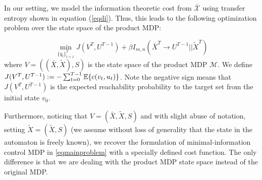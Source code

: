 




In our setting, we model the information theoretic cost from $\mathcal{\bar{X}}$ using transfer entropy shown in equation (\ref{eqdi}). Thus, this leads to the following optimization problem over the state space of the product MDP:

\begin{equation}\label{eqn:nonconstopt}
\min_{\{q_t\}_{t=1}^T} J(V^{T},U^{T-1}) + \beta I_{m,n}(\bar{X}^T \rightarrow U^{T-1}||\tilde{X}^T)
\end{equation}
where $V = ((\bar{X},\tilde{X}),S)$ is the state space of the product MDP $\mathcal{M}$. We define $J(V^T,U^{T-1}) := - \sum_{t=0}^{T-1}{\mathbb{E}\{c(v_t,u_t)\}}$. Note the negative sign means that $J(V^T,U^{T-1})$ is the expected reachability probability to the target set from the initial state $v_0$.

Furthermore, noticing that $V = (\bar{X},\tilde{X},S)$ and with slight abuse of notation, setting $\tilde{X} = (\tilde{X},S)$ (we assume without loss of generality that the state in the automaton is freely known), we recover the formulation of minimal-information control MDP in \eqref{eqmainproblem} with a specially defined cost function. The only difference is that we are dealing with the product MDP state space instead of the original MDP.

